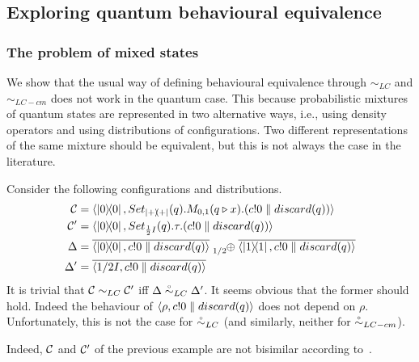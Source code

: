 \subsection{Exploring quantum behavioural equivalence}

\subsubsection*{The problem of mixed states}

We show that the usual way of defining behavioural equivalence through $\sim_{LC}$ and $\sim_{LC-cm}$ does not work in the quantum case.
This because probabilistic mixtures of quantum states are represented in two alternative ways, i.e., using density operators and using distributions of configurations.
Two different representations of the same mixture should be equivalent, but this is not always the case in the literature.

\begin{example}
	Consider the following configurations and distributions.
	\begin{align*}
		\conf &= \confw{\ketbra{0}{0}, Set_{\ketbra{+}{+}}(q).M_{0,1}(q \triangleright x).(c!0 \parallel discard(q))}\\
		\conf' &= \confw{\ketbra{0}{0}, Set_{\frac{1}{2} I}(q).\tau.(c!0 \parallel discard(q))}\\
		\Delta &= \overline{\confw{\ketbra{0}{0}, c!0 \parallel discard(q)}} \psum{1/2} \overline{\confw{\ketbra{1}{1}, c!0 \parallel discard(q)}}\\
		\Delta' &= \overline{\confw{1/2 I, c!0 \parallel discard(q)}}
	\end{align*}
	It is trivial that $\mathcal{C} \sim_{LC} \mathcal{C}'$ iff $\Delta	\stackrel{\scriptscriptstyle \circ}{\sim}_{LC} \Delta'$.
	It seems obvious that the former should hold.
	Indeed the behaviour of $\langle\rho, c!0 \parallel discard(q)\rangle$ does not depend on $\rho$.
	Unfortunately, this is not the case for $\stackrel{\scriptscriptstyle \circ}{\sim}_{LC}$ (and similarly, neither for $\stackrel{\scriptscriptstyle \circ}{\sim}_{LC-cm}$).
\end{example}
Indeed, $\mathcal{C}$ and $\mathcal{C}'$ of the previous example are not bisimilar according to~\cite{Feng:2012, Deng:2012}.

